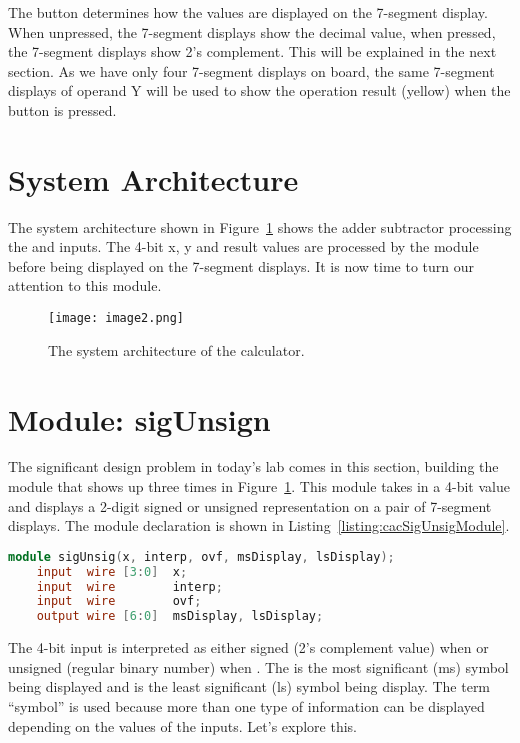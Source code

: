The  button determines how the values are displayed on the
7-segment display. When unpressed, the 7-segment displays show the
decimal value, when pressed, the 7-segment displays show 2's complement.
This will be explained in the next section. As we have only four 7-segment displays on
board, the same 7-segment displays of operand Y will be used to show the operation
result (yellow) when the  button is pressed.

\section{System Architecture}

The system architecture shown in Figure~\ref{fig:sysArchCalc} shows the adder subtractor
processing the  and  inputs. The 4-bit x, y and result
values are processed by the  module before being displayed on the
7-segment displays. It is now time to turn our attention to this module.

\begin{figure}[ht]
    \texttt{[image:  image2.png]}
    \caption{The system architecture of the calculator.}
    \label{fig:sysArchCalc}
\end{figure}

\section{Module: sigUnsign}

The significant design problem in today's lab comes in this section,
building the  module that shows up three times in Figure~\ref{fig:sysArchCalc}.
This module takes in a 4-bit value and
displays a 2-digit signed or unsigned representation on a pair of
7-segment displays. The  module declaration is shown in Listing~\ref{listing:cacSigUnsigModule}.

\begin{lstlisting}[language=Verilog,
 caption={Module declaration for the sigUnsig module.},
 label={listing:cacSigUnsigModule},
 frame=single]
 module sigUnsig(x, interp, ovf, msDisplay, lsDisplay);
    input  wire [3:0]  x;
    input  wire        interp;
    input  wire        ovf;
    output wire [6:0]  msDisplay, lsDisplay;
 \end{lstlisting}

The 4-bit input  is interpreted as either signed (2's complement
value) when  or unsigned (regular binary number) when
.  The  is the most significant (ms)
symbol being displayed and  is the least significant (ls)
symbol being display.  The term ``symbol'' is used because more than
one type of information can be displayed depending on the values
of the inputs.  Let's explore this.

